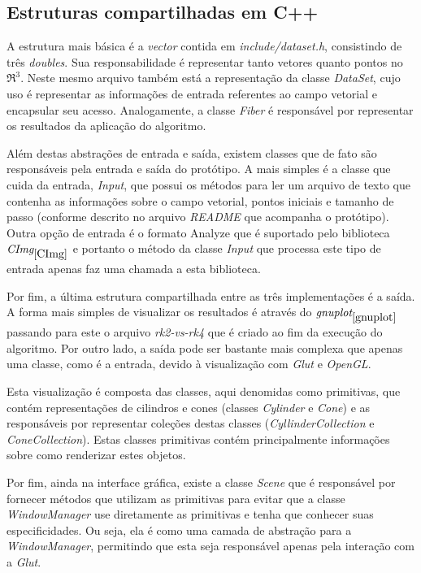  \subsection{Estruturas compartilhadas em C++}
  A estrutura mais básica é a \textit{vector} contida em \textit{include/dataset.h}, consistindo de três \textit{doubles}. Sua responsabilidade é representar tanto vetores quanto pontos no $\Re ^{3}$. Neste mesmo arquivo também está a representação da classe \textit{DataSet}, cujo uso é representar as informações de entrada referentes ao campo vetorial e encapsular seu acesso. Analogamente, a classe \textit{Fiber} é responsável por representar os resultados da aplicação do algoritmo.
  
  Além destas abstrações de entrada e saída, existem classes que de fato são responsáveis pela entrada e saída do protótipo. A mais simples é a classe que cuida da entrada, \textit{Input}, que possui os métodos para ler um arquivo de texto que contenha as informações sobre o campo vetorial, pontos iniciais e tamanho de passo (conforme descrito no arquivo \textit{README} que acompanha o protótipo). Outra opção de entrada é o formato Analyze que é suportado pelo biblioteca $\textit{CImg}_{\ref{CImg}}$ e portanto o método da classe \textit{Input} que processa este tipo de entrada apenas faz uma chamada a esta biblioteca.
  
  Por fim, a última estrutura compartilhada entre as três implementações é a saída. A forma mais simples de visualizar os resultados é através do $\textit{gnuplot}_{\ref{gnuplot}}$ passando para este o arquivo \textit{rk2-vs-rk4} que é criado ao fim da execução do algoritmo. Por outro lado, a saída pode ser bastante mais complexa que apenas uma classe, como é a entrada, devido à visualização com \textit{Glut} e \textit{OpenGL}.
  
  Esta visualização é composta das classes, aqui denomidas como primitivas, que contém representações de cilindros e cones (classes \textit{Cylinder} e \textit{Cone}) e as responsáveis por representar coleções destas classes (\textit{CyllinderCollection} e \textit{ConeCollection}). Estas classes primitivas contém principalmente informações sobre como renderizar estes objetos.
  
  Por fim, ainda na interface gráfica, existe a classe \textit{Scene} que é responsável por fornecer métodos que utilizam as primitivas para evitar que a classe \textit{WindowManager} use diretamente as primitivas e tenha que conhecer suas especificidades. Ou seja, ela é como uma camada de abstração para a \textit{WindowManager}, permitindo que esta seja responsável apenas pela interação com a \textit{Glut}. 
  
